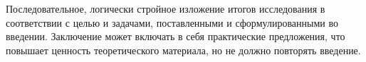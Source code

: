Последовательное, логически стройное изложение итогов исследования в соответствии с целью и задачами, поставленными и сформулированными во введении. Заключение может включать в себя практические предложения, что повышает ценность теоретического материала, но не должно повторять введение.
